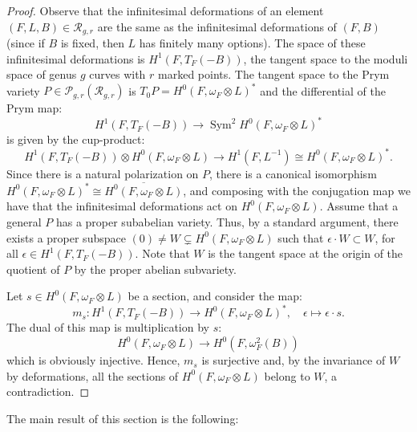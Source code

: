 \documentclass[preprint,12pt]{amsart}
\def\cP{\ensuremath{\mathcal{P}}}
\def\cR{\ensuremath{\mathcal{R}}}
\theoremstyle{plain}
\theoremstyle{definition}
\begin{document}
\begin{proof}
Observe that the infinitesimal deformations of an element $(F,L,B)\in \cR_{g,r}$ are the same as the infinitesimal deformations of $(F,B)$ (since if $B$ is fixed, then $L$ has finitely many options).
The space of these infinitesimal deformations is $H^1(F,T_F(-B))$, the tangent space to the moduli space of genus $g$ curves with $r$ marked points.
The tangent space to the Prym variety $P\in \cP_{g,r}(\cR_{g,r})$ is $T_0P=H^0(F,\omega_F\otimes L)^*$ and the differential of the Prym map:
\[
H^1(F,T_F(-B)) \to \operatorname{Sym}^2 H^0(F,\omega_F\otimes L)^*
\]
is given by the cup-product:
\[
H^1(F,T_F(-B))\otimes H^0(F,\omega_F \otimes L)\to H^1(F,L^{-1})\cong H^0(F,\omega_F\otimes L)^*.
\]
Since there is a natural polarization on $P$, there is a canonical isomorphism $H^0(F,\omega_F\otimes L)^*\cong \overline{H^0( F,\omega_F\otimes L)}$, and composing with the conjugation map we have that the infinitesimal deformations act on $H^0(F,\omega_F \otimes L)$.
Assume that a general $P$ has a proper subabelian variety.
Thus, by a standard argument, there exists a proper subspace $(0)\neq W \subsetneq H^0(F,\omega_F \otimes L)$ such that $\epsilon \cdot W \subset W$, for all $\epsilon \in H^1(F,T_F (-B))$.
Note that $W$ is the tangent space at the origin of the quotient of $P$ by the proper abelian subvariety.

Let $s \in H^0(F,\omega_F \otimes L)$ be a section, and consider the map:
\[
m_{s}:H^1(F,T_F (-B)) \to H^0(F,\omega_F \otimes L)^*, \quad \epsilon \mapsto \epsilon \cdot s.
\]
The dual of this map is multiplication by $s$:
\[
H^0(F,\omega_F \otimes L) \to H^0(F,\omega_F ^2(B)) 
\]
which is obviously injective.
Hence, $m_{s}$ is surjective and, by the invariance of $W$ by deformations, all the sections of $H^0(F,\omega_F \otimes L)$ belong to $W$, a contradiction.
\end{proof}






The main result of this section is the following:
\end{document}
